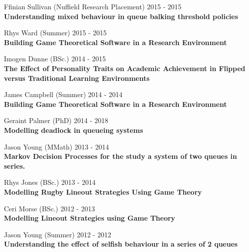 \documentclass[10pt]{res} %
\begin{document}
\begin{resume}
\begin{etaremune}
\item
    Ffinian Sullivan (Nuffield Research Placement) \hfill 2015 -
    2015\\
\textbf{Understanding mixed behaviour in queue balking threshold policies}\\

\item
    Rhys Ward (Summer) \hfill 2015 -
    2015\\
\textbf{Building Game Theoretical Software in a Research Environment}\\

\item
    Imogen Dunne (BSc.) \hfill 2014 -
    2015\\
\textbf{The Effect of Personality Traits on Academic Achievement in Flipped versus Traditional Learning Environments}\\

\item
    James Campbell (Summer) \hfill 2014 -
    2014\\
\textbf{Building Game Theoretical Software in a Research Environment}\\

\item
    Geraint Palmer (PhD) \hfill 2014 -
    2018\\
\textbf{Modelling deadlock in queueing systems}\\

\item
    Jason Young (MMath) \hfill 2013 -
    2014\\
\textbf{Markov Decision Processes for the study a system of two queues in series.}\\

\item
    Rhys Jones (BSc.) \hfill 2013 -
    2014\\
\textbf{Modelling Rugby Lineout Strategies Using Game Theory}\\

\item
    Ceri Morse (BSc.) \hfill 2012 -
    2013\\
\textbf{Modelling Lineout Strategies using Game Theory}\\

\item
    Jason Young (Summer) \hfill 2012 -
    2012\\
\textbf{Understanding the effect of selfish behaviour in a series of 2 queues}\\


\end{etaremune}
\end{resume}
\end{document}
